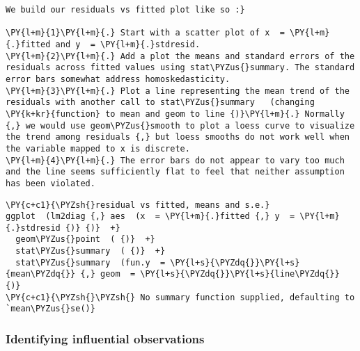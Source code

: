     \begin{tcolorbox}[breakable, size=fbox, boxrule=1pt, pad at break*=1mm,colback=cellbackground, colframe=cellborder]
\begin{Verbatim}[commandchars=\\\{\}]
We build our residuals vs fitted plot like so :}

\PY{l+m}{1}\PY{l+m}{.} Start with a scatter plot of x  = \PY{l+m}{.}fitted and y  = \PY{l+m}{.}stdresid.
\PY{l+m}{2}\PY{l+m}{.} Add a plot the means and standard errors of the residuals across fitted values using stat\PYZus{}summary. The standard error bars somewhat address homoskedasticity.
\PY{l+m}{3}\PY{l+m}{.} Plot a line representing the mean trend of the residuals with another call to stat\PYZus{}summary   (changing \PY{k+kr}{function} to mean and geom to line {)}\PY{l+m}{.} Normally {,} we would use geom\PYZus{}smooth to plot a loess curve to visualize the trend among residuals {,} but loess smooths do not work well when the variable mapped to x is discrete.
\PY{l+m}{4}\PY{l+m}{.} The error bars do not appear to vary too much and the line seems sufficiently flat to feel that neither assumption has been violated.
\end{Verbatim}
\end{tcolorbox}

    \begin{tcolorbox}[breakable, size=fbox, boxrule=1pt, pad at break*=1mm,colback=cellbackground, colframe=cellborder]
\begin{Verbatim}[commandchars=\\\{\}]
\PY{c+c1}{\PYZsh{}residual vs fitted, means and s.e.}
ggplot  (lm2diag {,} aes  (x  = \PY{l+m}{.}fitted {,} y  = \PY{l+m}{.}stdresid {)} {)}  +} 
  geom\PYZus{}point  ( {)}  +} 
  stat\PYZus{}summary  ( {)}  +} 
  stat\PYZus{}summary  (fun.y  = \PY{l+s}{\PYZdq{}}\PY{l+s}{mean\PYZdq{}} {,} geom  = \PY{l+s}{\PYZdq{}}\PY{l+s}{line\PYZdq{}} {)}
\PY{c+c1}{\PYZsh{}\PYZsh{} No summary function supplied, defaulting to `mean\PYZus{}se()}
\end{Verbatim}
\end{tcolorbox}

    \subsubsection{Identifying influential
observations}\label{identifying-influential-observations}

